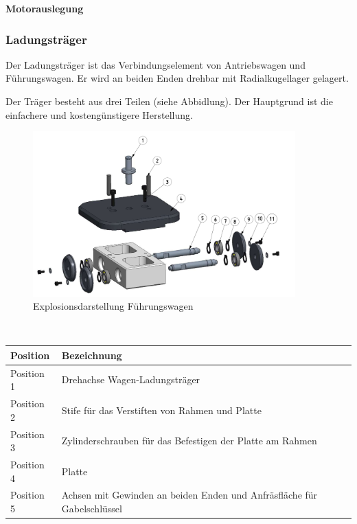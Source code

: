 \documentclass[../../main.tex]{subfiles}
\begin{document}
\begin{table}[H]
\begin{table}[H]
\begin{table}[H]
\begin{table}[H]
\begin{table}[H]
    \textbf{Motorauslegung}\\

    \subsubsection{Ladungsträger}
    Der Ladungsträger ist das Verbindungselement von Antriebswagen und Führungswagen. Er wird an beiden Enden drehbar mit Radialkugellager gelagert.

    Der Träger besteht aus drei Teilen (siehe Abbidlung). Der Hauptgrund ist die einfachere und kostengünstigere Herstellung.


    \begin{figure}[H] %
        \centering
        \includegraphics[width=0.9\textwidth]{Fuehrungswagen.png}
        \caption{Explosionsdarstellung Führungswagen}
        \label{fig:expl_fuehrungswagen}
    \end{figure}\\

    \begin{table}[H] \centering
        \begin{tabular}{|l|l|}
        \hline
        \textbf{Position} & \textbf{Bezeichnung}\\
        \hline
        Position 1          & Drehachse Wagen-Ladungsträger\\
         \hline
        Position 2          & Stife für das Verstiften von Rahmen und Platte\\
        \hline
        Position 3          & Zylinderschrauben für das Befestigen der Platte am Rahmen\\
        \hline
        Position 4          & Platte\\
        \hline
        Position 5          & Achsen mit Gewinden an beiden Enden und Anfräsfläche für Gabelschlüssel\\
        \hline
        \end{tabular}


\end{table}
\end{table}
\end{table}
\end{table}
\end{table}
\end{table}
\end{document}
